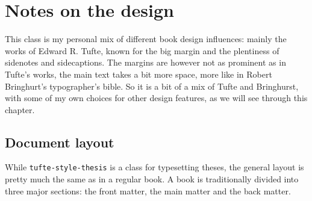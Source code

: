 
\chapter{Notes on the design}

This class is my personal mix of different book design influences: mainly the works of Edward R. Tufte,
 known for the big margin and the plentiness of
sidenotes and sidecaptions.
The margins are however not as prominent as in Tufte's works, the main text takes a bit more space,
more like in Robert Bringhurt's typographer's bible.
So it is a bit of a mix of Tufte and Bringhurst,
with some of my own choices for other design features, as we will see through this chapter.

\section{Document layout}

While \texttt{tufte-style-thesis} is a class for typesetting theses,
the general layout is pretty much the same as in a regular book.
A book is traditionally divided into three major sections:
the front matter, the main matter and the back matter.


